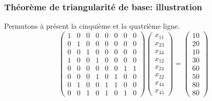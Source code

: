 \documentclass[usepdftitle=false]{beamer}
\begin{document}
\begin{frame}
\frametitle{Théorème de triangularité de base: illustration}

Permutons à présent la cinquième et la quatrième ligne.
\[
\begin{pmatrix}
 1 & 0 & 0 & 0 & 0 & 0 & 0 & 0 \\
 0 & 1 & 0 & 0 & 0 & 0 & 0 & 0 \\
 0 & 0 & 1 & 0 & 0 & 0 & 0 & 0 \\
 1 & 0 & 0 & 1 & 0 & 0 & 0 & 0 \\
 0 & 0 & 0 & 0 & 0 & 0 & 1 & 1 \\
 0 & 0 & 0 & 1 & 0 & 1 & 0 & 0 \\
 0 & 1 & 0 & 0 & 1 & 1 & 0 & 0 \\
 0 & 0 & 1 & 0 & 1 & 0 & 1 & 0
\end{pmatrix}
\begin{pmatrix}
x_{11} \\
x_{23} \\
x_{34} \\
x_{12} \\
x_{24} \\
x_{22} \\
x_{44} \\
x_{45}
\end{pmatrix}
=
\begin{pmatrix}
10 \\
20 \\
10 \\
30 \\
60 \\
50 \\
80 \\
80
\end{pmatrix}
\]

\end{frame}
\end{document}
